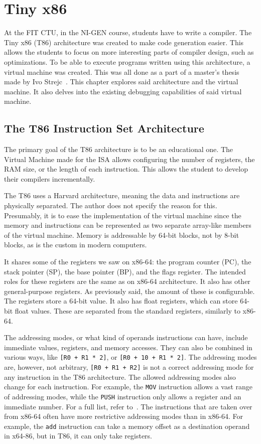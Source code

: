\chapter{Tiny x86}\label{section:T86}
At the FIT CTU, in the NI-GEN course, students have to write a compiler. The
Tiny x86 (T86) architecture was created to make code generation easier. This
allows the students to focus on more interesting parts of compiler design, such
as optimizations. To be able to execute programs written using this
architecture, a virtual machine was created. This was all done as a part of a
master's thesis made by Ivo Strejc~\cite{ivo2021tiny}. This chapter explores
said architecture and the virtual machine. It also delves into the existing
debugging capabilities of said virtual machine.

\section{The T86 Instruction Set Architecture}
The primary goal of the T86 architecture is to be an educational one. The
Virtual Machine made for the ISA allows configuring the number of registers,
the RAM size, or the length of each instruction. This allows the student to
develop their compilers incrementally.

The T86 uses a Harvard architecture, meaning the data and instructions are
physically separated. The author does not specify the reason for this.
Presumably, it is to ease the implementation of the virtual machine since the
memory and instructions can be represented as two separate array-like members
of the virtual machine. Memory is addressable by 64-bit blocks, not by 8-bit
blocks, as is the custom in modern computers.

It shares some of the registers we saw on x86-64: the program counter (PC), the
stack pointer (SP), the base pointer (BP), and the flags register. The intended
roles for these registers are the same as on x86-64 architecture. It also has
other general-purpose registers. As previously said, the amount of these is
configurable. The registers store a 64-bit value. It also has float registers,
which can store 64-bit float values. These are separated from the standard
registers, similarly to x86-64.

The addressing modes, or what kind of operands instructions can have, include
immediate values, registers, and memory accesses. They can also be combined in
various ways, like \texttt{[R0 + R1 * 2]}, or \texttt{[R0 + 10 + R1 * 2]}. The
addressing modes are, however, not arbitrary, \texttt{[R0 + R1 + R2]} is not a
correct addressing mode for any instruction in the T86 architecture. The
allowed addressing modes also change for each instruction. For example, the
\texttt{MOV} instruction allows a vast range of addressing modes, while the
\texttt{PUSH} instruction only allows a register and an immediate number. For a
full list, refer to~\cite{ivo2021tiny}. The instructions that are taken over
from x86-64 often have more restrictive addressing modes than in x86-64. For
example, the \verb|add| instruction can take a memory offset as a destination
operand in x64-86, but in T86, it can only take registers.

